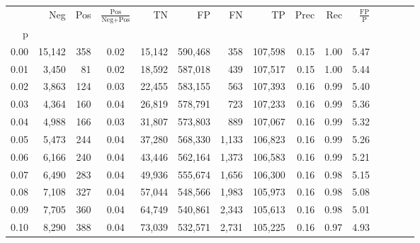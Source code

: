 \begin{tabular}{rrrcrrrrrrrrrrr}
\toprule
{} &     Neg &    Pos & $\frac{\text{Pos}}{\text{Neg}+\text{Pos}}$ &       TN &       FP &       FN &       TP &  Prec &   Rec & $\frac{\text{FP}}{\text{P}}$ \\
p    &         &        &                                            &          &          &          &          &       &       &                              \\
\midrule
0.00 &  15,142 &    358 &                                       0.02 &   15,142 &  590,468 &      358 &  107,598 &  0.15 &  1.00 &                         5.47 \\
0.01 &   3,450 &     81 &                                       0.02 &   18,592 &  587,018 &      439 &  107,517 &  0.15 &  1.00 &                         5.44 \\
0.02 &   3,863 &    124 &                                       0.03 &   22,455 &  583,155 &      563 &  107,393 &  0.16 &  0.99 &                         5.40 \\
0.03 &   4,364 &    160 &                                       0.04 &   26,819 &  578,791 &      723 &  107,233 &  0.16 &  0.99 &                         5.36 \\
0.04 &   4,988 &    166 &                                       0.03 &   31,807 &  573,803 &      889 &  107,067 &  0.16 &  0.99 &                         5.32 \\
0.05 &   5,473 &    244 &                                       0.04 &   37,280 &  568,330 &    1,133 &  106,823 &  0.16 &  0.99 &                         5.26 \\
0.06 &   6,166 &    240 &                                       0.04 &   43,446 &  562,164 &    1,373 &  106,583 &  0.16 &  0.99 &                         5.21 \\
0.07 &   6,490 &    283 &                                       0.04 &   49,936 &  555,674 &    1,656 &  106,300 &  0.16 &  0.98 &                         5.15 \\
0.08 &   7,108 &    327 &                                       0.04 &   57,044 &  548,566 &    1,983 &  105,973 &  0.16 &  0.98 &                         5.08 \\
0.09 &   7,705 &    360 &                                       0.04 &   64,749 &  540,861 &    2,343 &  105,613 &  0.16 &  0.98 &                         5.01 \\
0.10 &   8,290 &    388 &                                       0.04 &   73,039 &  532,571 &    2,731 &  105,225 &  0.16 &  0.97 &                         4.93 \\

\end{tabular}
